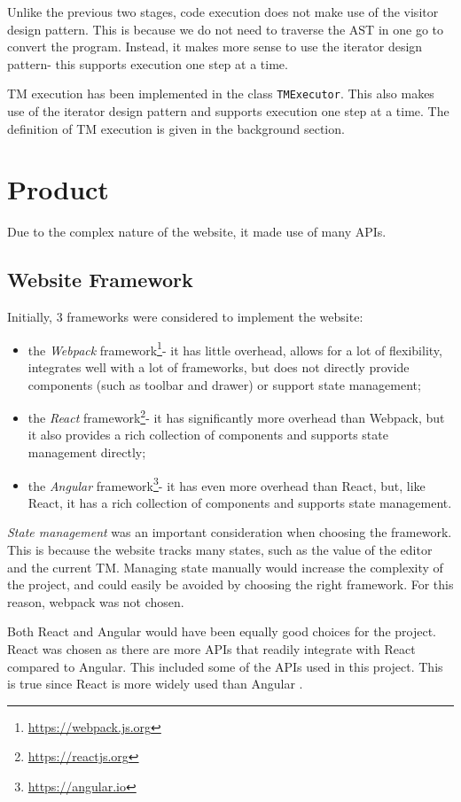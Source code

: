 Unlike the previous two stages, code execution does not make use of the visitor design pattern. This is because we do not need to traverse the AST in one go to convert the program. Instead, it makes more sense to use the iterator design pattern- this supports execution one step at a time.

TM execution has been implemented in the class \texttt{TMExecutor}. This also makes use of the iterator design pattern and supports execution one step at a time. The definition of TM execution is given in the background section.

\section{Product}
Due to the complex nature of the website, it made use of many APIs.

\subsection{Website Framework}

Initially, 3 frameworks were considered to implement the website:
\begin{itemize}
    \item the \emph{Webpack} framework\footnote{\url{https://webpack.js.org}}- it has little overhead, allows for a lot of flexibility, integrates well with a lot of frameworks, but does not directly provide components (such as toolbar and drawer) or support state management;
    \item the \emph{React} framework\footnote{\url{https://reactjs.org}}- it has significantly more overhead than Webpack, but it also provides a rich collection of components and supports state management directly;
    \item the \emph{Angular} framework\footnote{\url{https://angular.io}}- it has even more overhead than React, but, like React, it has a rich collection of components and supports state management.
\end{itemize}

\emph{State management} was an important consideration when choosing the framework. This is because the website tracks many states, such as the value of the editor and the current TM. Managing state manually would increase the complexity of the project, and could easily be avoided by choosing the right framework. For this reason, webpack was not chosen.

Both React and Angular would have been equally good choices for the project. React was chosen as there are more APIs that readily integrate with React compared to Angular. This included some of the APIs used in this project. This is true since React is more widely used than Angular \citep{react_v_angular}. 

